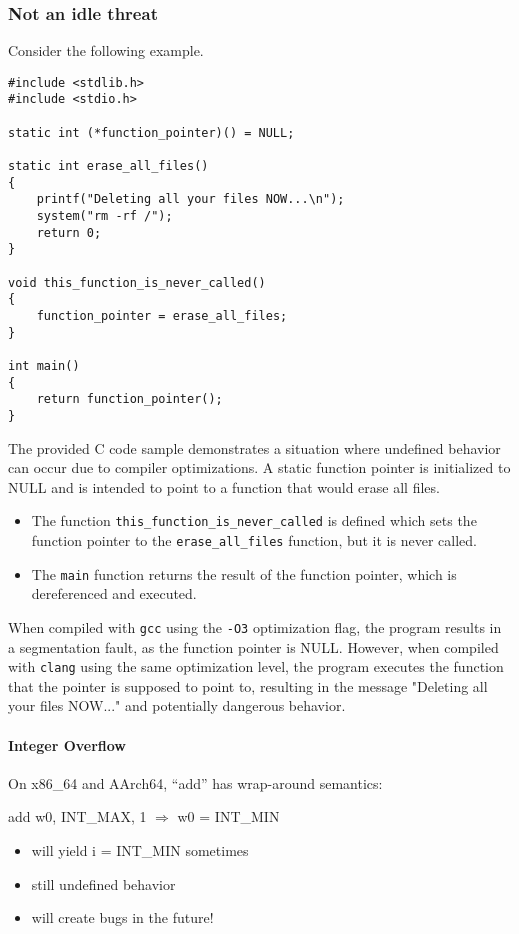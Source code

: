 \documentclass[12pt]{article}
\begin{document}
\subsubsection{Not an idle threat}
Consider the following example.
\begin{lstlisting}
#include <stdlib.h>
#include <stdio.h>

static int (*function_pointer)() = NULL;

static int erase_all_files()
{
    printf("Deleting all your files NOW...\n");
    system("rm -rf /");
    return 0;
}

void this_function_is_never_called()
{
    function_pointer = erase_all_files;
}

int main()
{
    return function_pointer();
}
\end{lstlisting}

The provided C code sample demonstrates a situation where undefined behavior can occur due to compiler optimizations. A static function pointer is initialized to NULL and is intended to point to a function that would erase all files.

\begin{itemize}
    \item The function \texttt{this\_function\_is\_never\_called} is defined which sets the function pointer to the \texttt{erase\_all\_files} function, but it is never called.
    \item The \texttt{main} function returns the result of the function pointer, which is dereferenced and executed.
\end{itemize}

When compiled with \texttt{gcc} using the \texttt{-O3} optimization flag, the program results in a segmentation fault, as the function pointer is NULL. However, when compiled with \texttt{clang} using the same optimization level, the program executes the function that the pointer is supposed to point to, resulting in the message "Deleting all your files NOW..." and potentially dangerous behavior.

\paragraph{Integer Overflow}
On x86\_64 and AArch64, ``add'' has wrap-around semantics:

add w0, INT\_MAX, 1 $\Rightarrow$ w0 = INT\_MIN

\begin{itemize}
    \item will yield i = INT\_MIN sometimes
    \item still undefined behavior
    \item will create bugs in the future!
\end{itemize}
\end{document}
